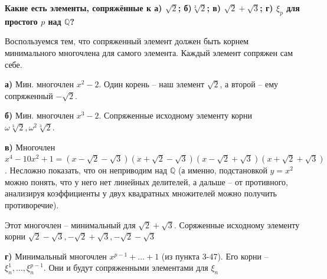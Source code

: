 \textbf{Какие есть элементы, сопряжённые к а) $\sqrt{2}$; б)$\sqrt[3]{2}$; в) $\sqrt{2} + \sqrt{3}$; г) $\xi_p$ для простого $p$ над $\mathbb{Q}$?}

Воспользуемся тем, что сопряженный элемент должен быть корнем минимального многочлена для самого элемента. Каждый элемент сопряжен сам себе.

\textbf{а)} Мин. многочлен $x^2 - 2$. Один корень -- наш элемент $\sqrt{2}$, а второй -- ему сопряженный $-\sqrt{2}$.

\textbf{б)} Мин. многочлен $x^3 - 2$. Сопряженные исходному элементу корни $\omega\sqrt[3]{2}, \omega^2\sqrt[3]{2}$.

\textbf{в)} Многочлен $x^4 - 10x^2 + 1 = (x - \sqrt{2} - \sqrt{3})(x + \sqrt{2} - \sqrt{3})(x - \sqrt{2} + 
\sqrt{3})(x + \sqrt{2} + \sqrt{3})$. Несложно показать, что он неприводим над $\mathbb{Q}$ (а именно, подстановкой $y = x^2$ можно понять, что у него нет линейных делителей, а дальше -- от противного, анализируя коэффициенты у двух квадратных множителей можно получить противоречие). 

Этот многочлен -- минимальный для $\sqrt{2} + \sqrt{3}$. Соряженные исходному элементу корни $\sqrt{2} - \sqrt{3}, -\sqrt{2} + \sqrt{3}, - \sqrt{2} - \sqrt{3}$

\textbf{г)} Минимальный многочлен $x^{p-1} + \ldots + 1$ (из пункта 3-47). Его корни -- $\xi_n^1, \ldots, \xi_n^{p-1}$. Они и будут сопряженными элементами для $\xi_n$